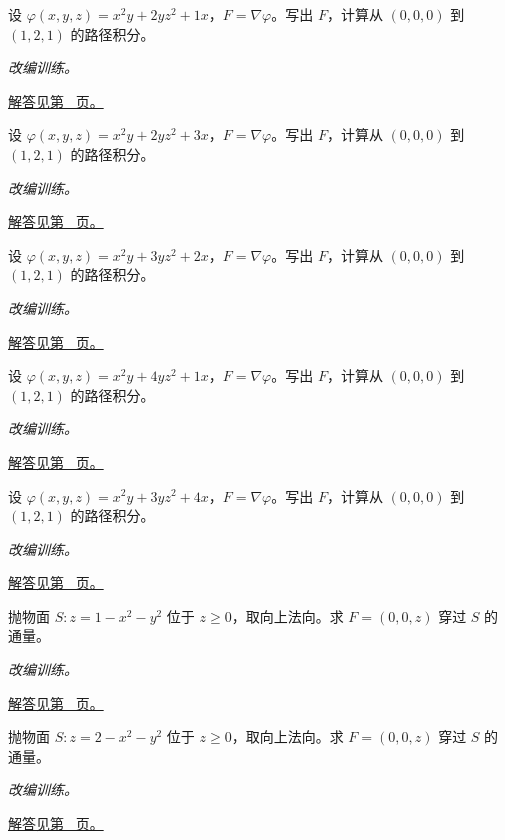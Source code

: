 \documentclass[UTF8,12pt,a4paper,fontset=fandol]{ctexart}
\begin{document}
\begin{example}[势函数给出的空间路径积分]\label{ex:c44q14}
设 $\varphi(x,y,z)=x^2y+2yz^2+1x$，$F=\nabla\varphi$。写出 $F$，计算从 $(0,0,0)$ 到 $(1,2,1)$ 的路径积分。
\par\textit{改编训练。}\par\hyperref[ans:c44q14]{解答见第~\pageref{ans:c44q14} 页。}
\end{example}
\begin{example}[势函数给出的空间路径积分]\label{ex:c44q15}
设 $\varphi(x,y,z)=x^2y+2yz^2+3x$，$F=\nabla\varphi$。写出 $F$，计算从 $(0,0,0)$ 到 $(1,2,1)$ 的路径积分。
\par\textit{改编训练。}\par\hyperref[ans:c44q15]{解答见第~\pageref{ans:c44q15} 页。}
\end{example}
\begin{example}[势函数给出的空间路径积分]\label{ex:c44q16}
设 $\varphi(x,y,z)=x^2y+3yz^2+2x$，$F=\nabla\varphi$。写出 $F$，计算从 $(0,0,0)$ 到 $(1,2,1)$ 的路径积分。
\par\textit{改编训练。}\par\hyperref[ans:c44q16]{解答见第~\pageref{ans:c44q16} 页。}
\end{example}
\begin{example}[势函数给出的空间路径积分]\label{ex:c44q17}
设 $\varphi(x,y,z)=x^2y+4yz^2+1x$，$F=\nabla\varphi$。写出 $F$，计算从 $(0,0,0)$ 到 $(1,2,1)$ 的路径积分。
\par\textit{改编训练。}\par\hyperref[ans:c44q17]{解答见第~\pageref{ans:c44q17} 页。}
\end{example}
\begin{example}[势函数给出的空间路径积分]\label{ex:c44q18}
设 $\varphi(x,y,z)=x^2y+3yz^2+4x$，$F=\nabla\varphi$。写出 $F$，计算从 $(0,0,0)$ 到 $(1,2,1)$ 的路径积分。
\par\textit{改编训练。}\par\hyperref[ans:c44q18]{解答见第~\pageref{ans:c44q18} 页。}
\end{example}
\begin{example}[封闭曲面与缺失底面]\label{ex:c44q19}
抛物面 $S:z=1-x^2-y^2$ 位于 $z\ge0$，取向上法向。求 $F=(0,0,z)$ 穿过 $S$ 的通量。
\par\textit{改编训练。}\par\hyperref[ans:c44q19]{解答见第~\pageref{ans:c44q19} 页。}
\end{example}
\begin{example}[封闭曲面与缺失底面]\label{ex:c44q20}
抛物面 $S:z=2-x^2-y^2$ 位于 $z\ge0$，取向上法向。求 $F=(0,0,z)$ 穿过 $S$ 的通量。
\par\textit{改编训练。}\par\hyperref[ans:c44q20]{解答见第~\pageref{ans:c44q20} 页。}
\end{example}
\end{document}
